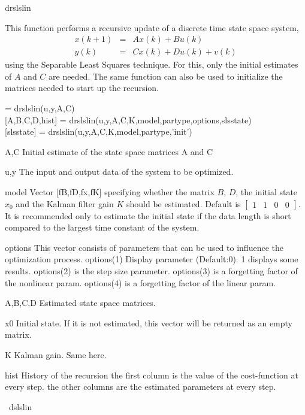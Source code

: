 \documentclass{book}
\newcommand{\mat}[2]{\left[\begin{array}{#1}#2\end{array}\right]}
\begin{document}
\begin{command}{drslslin}
\begin{purpose}
  This function performs a recursive update of a discrete time
  state space system,
  \begin{eqnarray*}
    x(k+1) & = &  A x(k) + B u(k)\\
    y(k) & = & C x(k) + D u(k) + v(k)
  \end{eqnarray*}
   using the Separable Least Squares technique.
  For this, only the initial estimates of $A$ and $C$ are needed.  
  The same function can also be used to initialize the matrices
  needed to start up the recursion.
 \end{purpose}
\begin{syntax}
  [A,B,C,D,hist] = drslslin(u,y,A,C)\\[0pt]
  [A,B,C,D,hist] = drslslin(u,y,A,C,K,model,partype,options,slsstate)\\[0pt]
  [slsstate] = drslslin(u,y,A,C,K,model,partype,'init')
\end{syntax}
\begin{inputs}
\item[A,C] Initial estimate of the state space matrices A and C
\item[u,y] The input and output data of the system to be optimized.
\item[model] Vector [fB,fD,fx,fK] specifying whether the matrix $B$,
  $D$, the initial state $x_0$ and the Kalman filter gain $K$ should
  be estimated.  Default is $\mat{cccc}{1& 1&0& 0}$. It is recommended only
  to estimate the initial state if the data length is short compared
  to the largest time constant of the system.
\item[options] This vector consists of parameters that can be used to
  influence the optimization process.  options(1) Display parameter
  (Default:0). 1 displays some results.  options(2) is the step size
  parameter.  options(3) is a forgetting factor of the nonlinear
  param.  options(4) is a forgetting factor of the linear param.
\end{inputs}
\begin{outputs} 
\item[A,B,C,D] Estimated state space matrices.
\item[x0] Initial state. If it is not estimated, this vector will be
  returned as an empty matrix.
\item[K] Kalman gain. Same here.
\item[hist] History of the recursion the first column is the value of
  the cost-function at every step.  the other columns are the estimated
  parameters at every step.
\end{outputs}
\begin{seealso}
\ dslslin
\end{seealso}
\end{command}%
 
\end{document}
